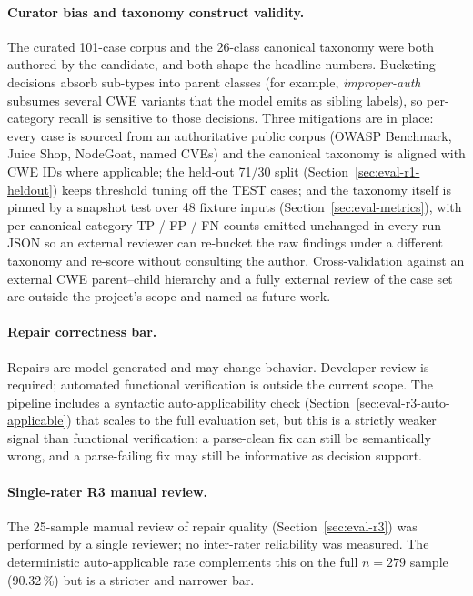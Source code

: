 \paragraph{Curator bias and taxonomy construct validity.}
The curated 101-case corpus and the 26-class canonical taxonomy were both authored by the candidate, and both shape the headline numbers. Bucketing decisions absorb sub-types into parent classes (for example, \emph{improper-auth} subsumes several CWE variants that the model emits as sibling labels), so per-category recall is sensitive to those decisions. Three mitigations are in place: every case is sourced from an authoritative public corpus (OWASP Benchmark, Juice Shop, NodeGoat, named CVEs) and the canonical taxonomy is aligned with CWE IDs where applicable; the held-out 71/30 split (Section~\ref{sec:eval-r1-heldout}) keeps threshold tuning off the TEST cases; and the taxonomy itself is pinned by a snapshot test over 48 fixture inputs (Section~\ref{sec:eval-metrics}), with per-canonical-category TP / FP / FN counts emitted unchanged in every run JSON so an external reviewer can re-bucket the raw findings under a different taxonomy and re-score without consulting the author. Cross-validation against an external CWE parent--child hierarchy and a fully external review of the case set are outside the project's scope and named as future work.

\paragraph{Repair correctness bar.}
Repairs are model-generated and may change behavior. Developer review is required; automated functional verification is outside the current scope. The pipeline includes a syntactic auto-applicability check (Section~\ref{sec:eval-r3-auto-applicable}) that scales to the full evaluation set, but this is a strictly weaker signal than functional verification: a parse-clean fix can still be semantically wrong, and a parse-failing fix may still be informative as decision support.

\paragraph{Single-rater R3 manual review.}
The 25-sample manual review of repair quality (Section~\ref{sec:eval-r3}) was performed by a single reviewer; no inter-rater reliability was measured. The deterministic auto-applicable rate complements this on the full $n=279$ sample (90.32\,\%) but is a stricter and narrower bar.

